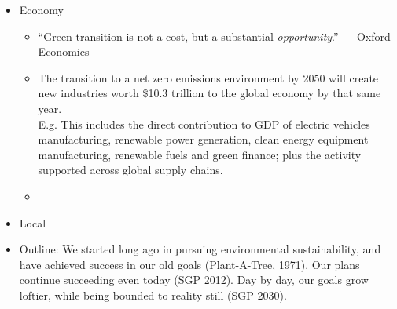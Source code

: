 \documentclass[oneside]{book}
\begin{document}
\begin{enumerate}
\begin{itemize}
\begin{itemize}
                (recognize) uncertainties in climate science.'' --- American Petroleum Institute
                \item ``information laundering'':
                projecting the company's desired message through
                ostensibly independent nonprofit organizations. 
                \item ExxonMobil underwrites well-established
                groups such as the American Enterprise Institute \footnotesize(It's often the single largest corporate donor to many of these nonprofit organizations, frequently accounting for more than 10 percent of their annual budgets. Most of these organizations also include
                these same individuals as board members or
                scientific advisers.)\normalsize
                \item Behind closed doors and in academic circles, Exxon has known that its products would likely cause dangerous global warming since at least the 1970s. The oil industry as a whole has been on notice even longer --- since the 1950s.
                \item Uncomfortable realization is how subtle and systematic and increasingly sophisticated their propaganda has become --- had to rely on statistical techniques from computational linguistics to uncover patterns of speech hiding in plain sight.
        \end{itemize} 
        \item Economy
        \begin{itemize}
            \item ``Green transition is not a cost, but a substantial \emph{opportunity}.'' --- Oxford Economics
            \item The transition to a net zero emissions environment by 2050 will create new industries worth 
            \$10.3 trillion to the global economy by that same year.\\
            \footnotesize E.g. This includes the direct contribution to GDP of electric 
            vehicles manufacturing, renewable power generation, 
            clean energy equipment manufacturing, renewable fuels 
            and green finance; plus the activity supported across 
            global supply chains. \normalsize
            \item 
        \end{itemize}
        \item Local
        \item Outline: We started long ago in pursuing environmental sustainability, and have achieved success in our old goals (Plant-A-Tree, 1971). Our plans continue succeeding even today (SGP 2012). Day by day, our goals grow loftier, while being bounded to reality still (SGP 2030).  

\end{itemize}
\end{enumerate}
\end{document}
